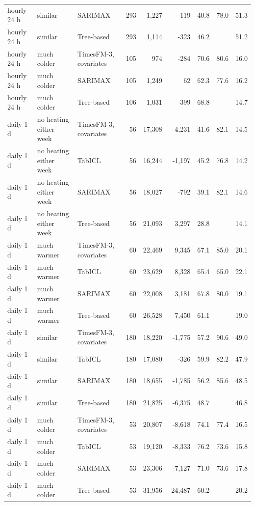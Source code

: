 \begin{tabular}{lllrrrrrr}
hourly 24 h & similar & SARIMAX & 293 & 1,227 & -119 & 40.8 & 78.0 & 51.3 \\
hourly 24 h & similar & Tree-based & 293 & 1,114 & -323 & 46.2 &  & 51.2 \\
hourly 24 h & much colder & TimesFM-3, covariates & 105 & 974 & -284 & 70.6 & 80.6 & 16.0 \\
hourly 24 h & much colder & SARIMAX & 105 & 1,249 & 62 & 62.3 & 77.6 & 16.2 \\
hourly 24 h & much colder & Tree-based & 106 & 1,031 & -399 & 68.8 &  & 14.7 \\
daily 1 d & no heating either week & TimesFM-3, covariates & 56 & 17,308 & 4,231 & 41.6 & 82.1 & 14.5 \\
daily 1 d & no heating either week & TabICL & 56 & 16,244 & -1,197 & 45.2 & 76.8 & 14.2 \\
daily 1 d & no heating either week & SARIMAX & 56 & 18,027 & -792 & 39.1 & 82.1 & 14.6 \\
daily 1 d & no heating either week & Tree-based & 56 & 21,093 & 3,297 & 28.8 &  & 14.1 \\
daily 1 d & much warmer & TimesFM-3, covariates & 60 & 22,469 & 9,345 & 67.1 & 85.0 & 20.1 \\
daily 1 d & much warmer & TabICL & 60 & 23,629 & 8,328 & 65.4 & 65.0 & 22.1 \\
daily 1 d & much warmer & SARIMAX & 60 & 22,008 & 3,181 & 67.8 & 80.0 & 19.1 \\
daily 1 d & much warmer & Tree-based & 60 & 26,528 & 7,450 & 61.1 &  & 19.0 \\
daily 1 d & similar & TimesFM-3, covariates & 180 & 18,220 & -1,775 & 57.2 & 90.6 & 49.0 \\
daily 1 d & similar & TabICL & 180 & 17,080 & -326 & 59.9 & 82.2 & 47.9 \\
daily 1 d & similar & SARIMAX & 180 & 18,655 & -1,785 & 56.2 & 85.6 & 48.5 \\
daily 1 d & similar & Tree-based & 180 & 21,825 & -6,375 & 48.7 &  & 46.8 \\
daily 1 d & much colder & TimesFM-3, covariates & 53 & 20,807 & -8,618 & 74.1 & 77.4 & 16.5 \\
daily 1 d & much colder & TabICL & 53 & 19,120 & -8,333 & 76.2 & 73.6 & 15.8 \\
daily 1 d & much colder & SARIMAX & 53 & 23,306 & -7,127 & 71.0 & 73.6 & 17.8 \\
daily 1 d & much colder & Tree-based & 53 & 31,956 & -24,487 & 60.2 &  & 20.2 \\

\end{tabular}
